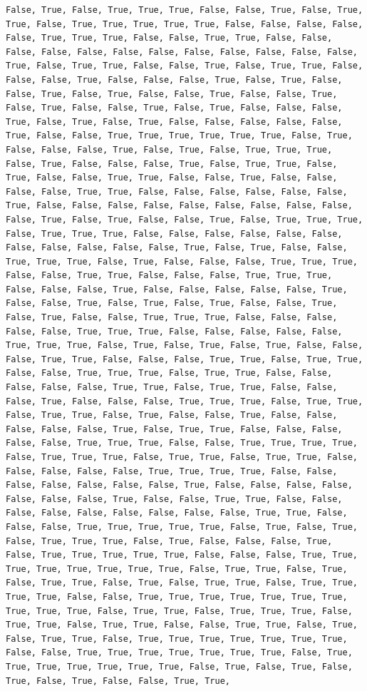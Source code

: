 \documentclass[
  letterpaper,
  DIV=11,
  numbers=noendperiod]{scrartcl}
\begin{document}
\begin{verbatim}
False, True, False, True, True, True, False, False, True, False, True, True, False, True, True, True, True, True, False, False, False, False, False, True, True, True, False, False, True, True, False, False, False, False, False, False, False, False, False, False, False, False, True, False, True, True, False, False, True, False, True, True, False, False, False, True, False, False, False, True, False, True, False, False, True, False, True, False, False, True, False, False, True, False, True, False, False, True, False, True, False, False, False, True, False, True, False, True, False, False, False, False, False, True, False, False, True, True, True, True, True, True, False, True, False, False, False, True, False, True, False, True, True, True, False, True, False, False, False, True, False, True, True, False, True, False, False, True, True, False, False, True, False, False, False, False, True, True, False, False, False, False, False, False, True, False, False, False, False, False, False, False, False, False, False, True, False, True, False, False, True, False, True, True, True, False, True, True, True, False, False, False, False, False, False, False, False, False, False, False, True, False, True, False, False, True, True, True, False, True, False, False, False, True, True, True, False, False, True, True, False, False, False, True, True, True, False, False, False, True, False, False, False, False, False, True, False, False, True, False, True, False, True, False, False, True, False, True, False, False, True, True, True, False, False, False, False, False, True, True, True, False, False, False, False, False, True, True, True, False, True, False, True, False, True, False, False, False, True, True, False, False, False, True, True, False, True, True, False, False, True, True, True, False, True, True, False, False, False, False, False, True, True, False, True, True, False, False, False, True, False, False, False, True, True, True, False, True, True, False, True, True, False, True, False, False, True, False, False, False, False, False, True, False, True, True, False, False, False, False, False, True, True, True, False, False, True, True, True, True, False, True, True, True, False, True, True, False, True, True, False, False, False, False, False, True, True, True, True, False, False, False, False, False, False, False, True, False, False, False, False, False, False, False, True, False, False, True, True, False, False, False, False, False, False, False, False, False, True, True, False, False, False, True, True, True, True, True, False, True, False, True, False, True, True, True, False, True, False, False, False, True, False, True, True, True, True, True, False, False, False, True, True, True, True, True, True, True, True, False, True, True, False, True, False, True, True, False, True, False, True, True, False, True, True, True, True, False, False, True, True, True, True, True, True, True, True, True, True, False, True, True, False, True, True, True, False, True, True, False, True, True, False, False, True, True, False, True, False, True, True, False, True, True, True, True, True, True, True, False, False, True, True, True, True, True, True, True, False, True, True, True, True, True, True, True, False, True, False, True, False, True, False, True, False, False, True, True, 
\end{verbatim}
\end{document}
